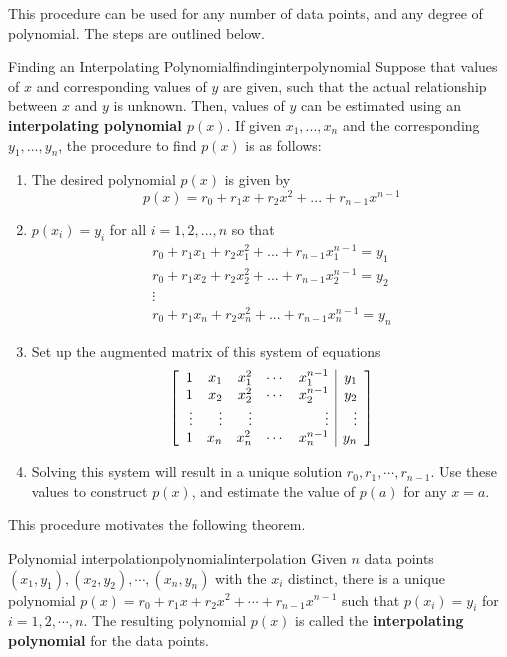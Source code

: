 This procedure can be used for any number of data points, and any degree of polynomial. The steps are outlined below.

\begin{procedure}{Finding an Interpolating Polynomial}{findinginterpolynomial}
Suppose that values of $x$ and corresponding values of $y$ are given, such that the actual relationship between $x$ and $y$ is unknown. Then, values of $y$ can be estimated using an \textbf{interpolating polynomial $p(x)$}. If given $x_1, ..., x_n$ and the corresponding $y_1, ..., y_n$, the procedure to find $p(x)$ is as follows:
\begin{enumerate}
\item The desired polynomial $p(x)$ is given by 
\[
p(x) = r_0 + r_1 x + r_2 x^2 + ... + r_{n-1}x^{n-1}
\]
\item $p(x_i) = y_i$ for all $i = 1, 2, ...,n$ so that
\[
\begin{array}{c}
r_0 + r_1x_1 + r_2 x_1^2 + ... + r_{n-1}x_1^{n-1} = y_1 \\
r_0 + r_1x_2 + r_2 x_2^2 + ... + r_{n-1}x_2^{n-1} = y_2 \\
\vdots \\
r_0 + r_1x_n + r_2 x_n^2 + ... + r_{n-1}x_n^{n-1} = y_n 
\end{array}
\]
\item Set up the augmented matrix of this system of equations
\[
\left[
\begin{array}{rrrrr|r}
1 & x_1 & x_1^2 & \cdots & x_1^{n-1} & y_1 \\
1 & x_2 & x_2^2 & \cdots & x_2^{n-1} & y_2 \\
\vdots & \vdots & \vdots & &\vdots & \vdots \\
1 & x_n & x_n^2 & \cdots & x_n^{n-1} & y_n \\
\end{array}
\right]
\]

\item Solving this system will result in a unique solution $r_0, r_1, \cdots, r_{n-1}$. Use these values to construct $p(x)$, and estimate the value of $p(a)$ for any $x=a$. 
\end{enumerate}

\end{procedure}

This procedure motivates the following theorem.

\begin{theorem}{Polynomial interpolation}{polynomialinterpolation}
Given $n$ data points $(x_1, y_1), (x_2, y_2), \cdots, (x_n, y_n)$ with the $x_i$ distinct, there is a unique polynomial $p(x) = r_0 + r_1x + r_2x^2 + \cdots + r_{n-1}x^{n-1}$ such that $p(x_i) = y_i$ for $i=1,2,\cdots, n$. The resulting polynomial $p(x)$ is called the \textbf{interpolating polynomial} for the data points. 
\end{theorem}

